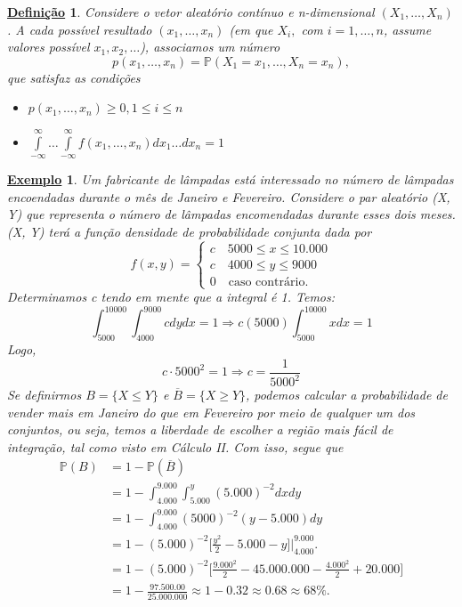 \documentclass{article}
\newtheorem*{def*}{\underline{Defini\c c\~ao}}
\newtheorem{example}{\underline{Exemplo}}
\begin{document}
\begin{def*}
  Considere o vetor aleatório contínuo e n-dimensional \((X_{1}, \dotsc , X_{n})\). A cada possível resultado \((x_{1}, \dotsc , x_{n})\) (em que \(X_{i},\) com \(i=1, \dotsc , n\), assume valores possível \(x_{1}, x_{2}, \dotsc \)), associamos um número 
  \[
    p(x_{1}, \dotsc , x_{n}) = \mathbb{P}(X_{1} = x_{1}, \dotsc , X_{n}=x_{n}),
  \]
  que satisfaz as condições 
  \begin{itemize}
    \item[i)] \(p(x_{1}, \dotsc , x_{n}) \geq 0, 1 \leq i \leq n\)
    \item[ii)] \(\int\limits_{-\infty}^{\infty}\dotsc \int\limits_{-\infty}^{\infty}f(x_{1}, \dotsc , x_{n})dx_{1}\dotsc dx_{n} = 1\)
  \end{itemize}
\end{def*}
\begin{example}
  Um fabricante de lâmpadas está interessado no número de lâmpadas encoendadas durante o mês de Janeiro e Fevereiro. Considere o par aleatório (X, Y) que representa o número de
lâmpadas encomendadas durante esses dois meses. (X, Y) terá a função densidade de probabilidade conjunta dada por 
  \[
    f(x, y)  = \left\{\begin{array}{ll}
      c\quad 5000 \leq x \leq 10.000\\ 
      c\quad 4000 \leq y\leq 9000\\
      0\quad \text{caso contrário.}
      \end{array}\right.
  \]
  Determinamos c tendo em mente que a integral é 1. Temos:
  \[
    \int_{5000}^{10000}\int_{4000}^{9000}cdydx = 1 \Rightarrow c(5000)\int_{5000}^{10000}xdx = 1
  \]
Logo, 
  \[
    c \cdot 5000^{2} = 1 \Rightarrow c = \frac{1}{5000^{2}}
  \]
  Se definirmos \(B = \{X \leq Y\}\) e \(\overline{B} = \{X \geq Y\}\), podemos calcular a probabilidade de vender mais em 
Janeiro do que em Fevereiro por meio de qualquer um dos conjuntos, ou seja, temos a liberdade de escolher a região mais fácil de integração,
tal como visto em Cálculo II. Com isso, segue que 
  \begin{align*}
    \mathbb{P}(B) &= 1 - \mathbb{P}(\overline{B}) \\
                  &= 1 - \int_{4.000}^{9.000} \int_{5.000}^{y}(5.000)^{-2}dxdy\\
                  &= 1 - \int_{4.000}^{9.000} (5000)^{-2}(y - 5.000)dy\\
                  &= 1 - (5.000)^{-2}\biggl[\frac{y^{2}}{2} - 5.000-y\biggr]\biggl|_{4.000}^{9.000}\biggr.\\
                  &= 1 - (5.000)^{-2}\biggl[\frac{9.000^{2}}{2} - 45.000.000 - \frac{4.000^{2}}{2} + 20.000\biggr]\\
                  &= 1 - \frac{97.500.00}{25.000.000} \approx 1 - 0.32 \approx 0.68 \approx 68\%.
  \end{align*}
\end{example}
\end{document}
